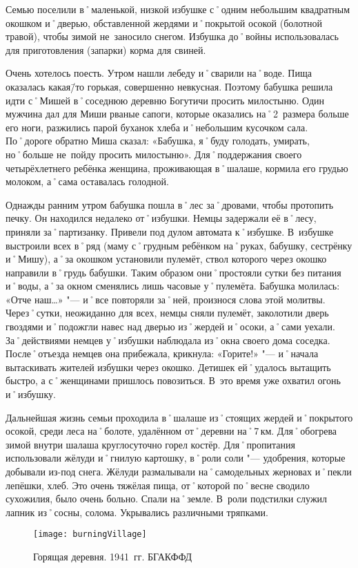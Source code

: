 Семью поселили в˚маленькой, низкой избушке с˚одним небольшим квадратным окошком и˚дверью, обставленной жердями и˚покрытой осокой (болотной травой), чтобы зимой не~заносило снегом. Избушка до˚войны использовалась для приготовления (запарки) корма для свиней.

Очень хотелось поесть. Утром нашли лебеду и˚сварили на˚воде. Пища оказалась какая\=/то горькая, совершенно невкусная. Поэтому бабушка решила идти с˚Мишей в˚соседнюю деревню Богутичи просить милостыню. Один мужчина дал для Миши рваные сапоги, которые оказались на˚2~размера больше его ноги, разжились парой буханок хлеба и˚небольшим кусочком сала. По˚дороге обратно Миша сказал: «Бабушка, я˚буду голодать, умирать, но˚больше не~пойду просить милостыню». Для˚поддержания своего четырёхлетнего ребёнка женщина, проживающая  в˚шалаше, кормила его грудью молоком, а˚сама оставалась голодной.

Однажды ранним утром бабушка пошла в˚лес за˚дровами, чтобы протопить печку. Он находился недалеко от˚избушки. Немцы задержали её в˚лесу, приняли за˚партизанку. Привели под дулом автомата к˚избушке. В~избушке выстроили всех в˚ряд (маму с˚грудным ребёнком на˚руках, бабушку, сестрёнку и˚Мишу), а˚за окошком установили пулемёт, ствол которого через окошко направили в˚грудь бабушки. Таким образом они˚простояли сутки без питания и˚воды, а˚за окном сменялись лишь часовые у˚пулемёта. Бабушка молилась: «Отче наш…» "--- и˚все повторяли за˚ней, произнося слова этой молитвы. Через˚сутки, неожиданно для всех, немцы сняли пулемёт, заколотили дверь гвоздями и˚подожгли навес над дверью из˚жердей и˚осоки, а˚сами уехали. За˚действиями немцев у˚избушки наблюдала из˚окна своего дома соседка. После˚отъезда немцев она прибежала, крикнула: «Горите!» "--- и˚начала вытаскивать жителей избушки через окошко. Детишек ей˚удалось вытащить быстро, а с˚женщинами пришлось повозиться. В~это время уже охватил огонь и˚избушку.

Дальнейшая жизнь семьи проходила в˚шалаше из˚стоящих жердей и˚покрытого осокой, среди леса на˚болоте, удалённом от˚деревни на˚7\,км. Для˚обогрева зимой внутри шалаша круглосуточно горел костёр. Для˚пропитания использовали жёлуди и˚гнилую картошку, в˚роли соли "--- удобрения, которые добывали из-под снега. Жёлуди размалывали на˚самодельных жерновах и˚пекли лепёшки, хлеб. Это очень тяжёлая пища, от˚которой по˚весне сводило сухожилия, было очень больно. Спали на˚земле. В~роли подстилки служил лапник из˚сосны, солома. Укрывались различными тряпками.


\begin{wrapfigure}{O}{.4\textwidth}
\centering
\texttt{[image: burningVillage]}
\caption[Горящая деревня. 1941~гг. БГАКФФД]{Горящая деревня. 1941~гг. БГАКФФД\footnotemark}
\label{fig:burningVillage}
\end{wrapfigure}

